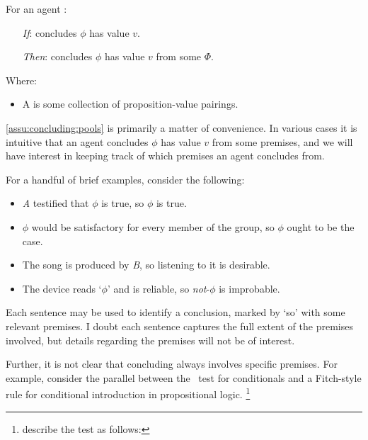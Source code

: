 \begin{note}

  \begin{assumption}
    \label{assu:concluding:pools}
    For an agent \vAgent{}:

    \begin{enumerate}
    \item[\emph{If}:]
      \vAgent{} concludes \(\phi\) has value \(v\).
    \item[\emph{Then}:]
      \vAgent{} concludes \(\phi\) has value \(v\) from some \poP{} \(\Phi\).
    \end{enumerate}
    Where:
    \begin{itemize}
    \item
      A \poP{} is some collection of proposition-value pairings.
    \end{itemize}
    \vspace{-\baselineskip}
  \end{assumption}

  \autoref{assu:concluding:pools} is primarily a matter of convenience.
  In various cases it is intuitive that an agent concludes \(\phi\) has value \(v\) from some premises, and we will have interest in keeping track of which premises an agent concludes from.

  For a handful of brief examples, consider the following:

  \begin{itemize}[noitemsep]
  \item
    \emph{A} testified that \(\phi\) is true, so \(\phi\) is true.
  \item
    \(\phi\) would be satisfactory for every member of the group, so \(\phi\) ought to be the case.
  \item
    The song is produced by \emph{B}, so listening to it is desirable.
  \item
    The device reads `\(\phi\)' and is reliable, so \emph{not}-\(\phi\) is improbable.
  \end{itemize}

  Each sentence may be used to identify a conclusion, marked by `so' with some relevant premises.
  I doubt each sentence captures the full extent of the premises involved, but details regarding the premises will not be of interest.

  Further, it is not clear that concluding always involves specific premises.
  For example, consider the parallel between the~\citeauthor{Ramsey:1929tf} test for conditionals and a Fitch-style rule for conditional introduction in propositional logic.%
  \footnote{
    \textcite{Read:1995wf} describe the test as follows:

}
\end{note}
